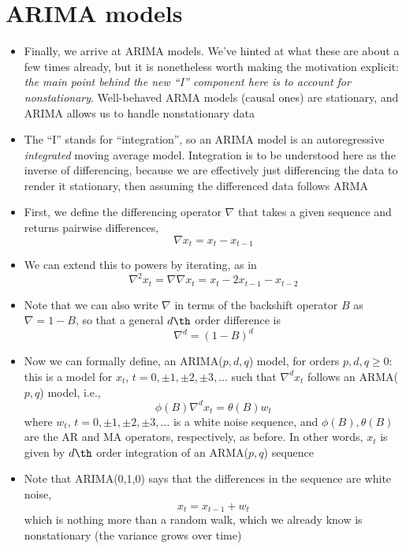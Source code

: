 \documentclass{article}
\begin{document}
\section{ARIMA models}

\begin{itemize}
\item Finally, we arrive at ARIMA models. We've hinted at what these are about a
  few times already, but it is nonetheless worth making the motivation explicit:
  \emph{the main point behind the new ``I'' component here is to account for
    nonstationary}. Well-behaved ARMA models (causal ones) are stationary, and
  ARIMA allows us to handle nonstationary data   

\item The ``I'' stands for ``integration'', so an ARIMA model is an
  autoregressive \emph{integrated} moving average model. Integration is to be
  understood here as the inverse of differencing, because we are effectively
  just differencing the data to render it stationary, then assuming the
  differenced data follows ARMA  

\item First, we define the differencing operator $\nabla$ that takes a given
  sequence and returns pairwise differences,  
  \[
  \nabla x_t = x_t - x_{t-1}
  \]

\item We can extend this to powers by iterating, as in 
  \[
  \nabla^2 x_t = \nabla \nabla x_t = x_t - 2 x_{t-1} - x_{t-2}
  \]

\item Note that we can also write $\nabla$ in terms of the backshift operator
  $B$ as $\nabla = 1 - B$, so that a general $d\th$ order difference is
  \[
  \nabla^d = (1-B)^d 
  \]

\item Now we can formally define, an ARIMA($p,d,q$) model, for orders $p,d,q  
  \geq 0$: this is a model for $x_t$, $t = 0, \pm 1, \pm 2, \pm 3, \dots$ such
  that $\nabla^d x_t$ follows an ARMA($p,q$) model, i.e., 
  \begin{equation}
  \label{eq:arima_pdq}
  \phi(B) \nabla^d x_t = \theta(B) w_t
  \end{equation}
  where $w_t$, $t = 0, \pm 1, \pm 2, \pm 3, \dots$ is a white noise sequence,
  and $\phi(B),\theta(B)$ are the AR and MA operators, respectively, as before. 
  In other words, $x_t$ is given by $d\th$ order integration of an ARMA($p,q$)
  sequence 

\item Note that ARIMA(0,1,0) says that the differences in the sequence are white
  noise, 
  \[
  x_t = x_{t-1} + w_t
  \]
  which is nothing more than a random walk, which we already know is
  nonstationary (the variance grows over time)


\end{itemize}
\end{document}
